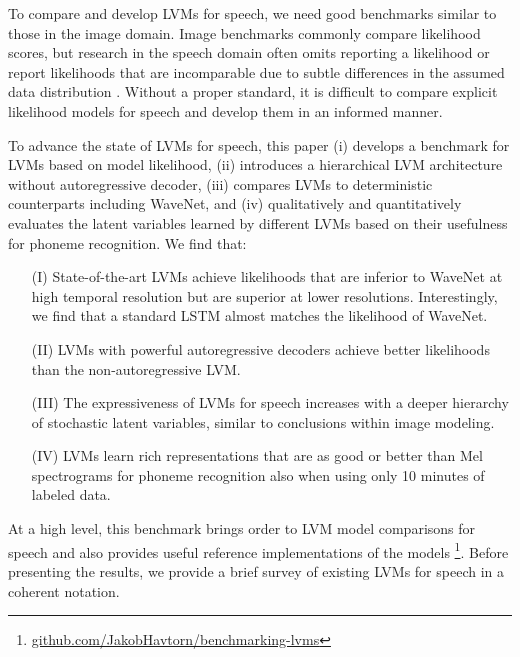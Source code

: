 To compare and develop LVMs for speech, we need good benchmarks similar to those in the image domain. Image benchmarks commonly compare likelihood scores, but research in the speech domain often omits reporting a likelihood \cite{oord_wavenet_2016, hsu_unsupervised_2017, oord_neural_2018} or report likelihoods that are incomparable due to subtle differences in the assumed data distribution \cite{chung_recurrent_2015, fraccaro_sequential_2016, hsu_unsupervised_2017, aksan_stcn_2019}. Without a proper standard, it is difficult to compare explicit likelihood models for speech and develop them in an informed manner.

To advance the state of LVMs for speech, this paper (i) develops a benchmark for LVMs based on model likelihood, (ii) introduces a hierarchical LVM architecture without autoregressive decoder, (iii) compares LVMs to deterministic counterparts including WaveNet, and (iv) qualitatively and quantitatively evaluates the latent variables learned by different LVMs based on their usefulness for phoneme recognition. We find that:
\begin{itemize}[leftmargin=8mm]
    \setlength\itemsep{-0em}
    \item [(I)] State-of-the-art LVMs achieve likelihoods that are inferior to WaveNet at high temporal resolution but are superior at lower resolutions. Interestingly, we find that a standard LSTM \cite{hochreiter_long_1997} almost matches the likelihood of WaveNet.
    \item [(II)] LVMs with powerful autoregressive decoders achieve better likelihoods than the non-autoregressive LVM.
    \item[(III)] The expressiveness of LVMs for speech increases with a deeper hierarchy of stochastic latent variables, similar to conclusions within image modeling. %
    \item[(IV)] LVMs learn rich representations that are as good or better than Mel spectrograms for phoneme recognition also when using only 10 minutes of labeled data.
\end{itemize}
At a high level, this benchmark brings order to LVM model comparisons for speech and also provides useful reference implementations of the models
\footnote{\href{https://github.com/JakobHavtorn/benchmarking-lvms}{\url{github.com/JakobHavtorn/benchmarking-lvms}}}.
Before presenting the results, we provide a brief survey of existing LVMs for speech in a coherent notation. 


